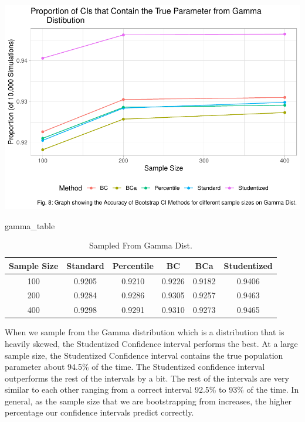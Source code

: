 \documentclass[12pt]{article}
\newenvironment{Shaded}{\begin{snugshade}}{\end{snugshade}}
\newcommand{\NormalTok}[1]{#1}
\begin{document}
\includegraphics{paper_files/figure-latex/unnamed-chunk-22-1.pdf}

\begin{Shaded}
\begin{Highlighting}[]
\NormalTok{gamma\_table}
\end{Highlighting}
\end{Shaded}

\begin{table}

\caption{\label{tab:create graphs}Sampled From Gamma Dist.}
\centering
\begin{tabular}[t]{cccccc}
\toprule
Sample Size & Standard & Percentile & BC & BCa & Studentized\\
\midrule
100 & 0.9205 & 0.9210 & 0.9226 & 0.9182 & 0.9406\\
200 & 0.9284 & 0.9286 & 0.9305 & 0.9257 & 0.9463\\
400 & 0.9298 & 0.9291 & 0.9310 & 0.9273 & 0.9465\\
\bottomrule
\end{tabular}
\end{table}

When we sample from the Gamma distribution which is a distribution that
is heavily skewed, the Studentized Confidence interval performs the
best. At a large sample size, the Studentized Confidence interval
contains the true population parameter about 94.5\% of the time. The
Studentized confidence interval outperforms the rest of the intervals by
a bit. The rest of the intervals are very similar to each other ranging
from a correct interval 92.5\% to 93\% of the time. In general, as the
sample size that we are bootstrapping from increases, the higher
percentage our confidence intervals predict correctly.
\end{document}
